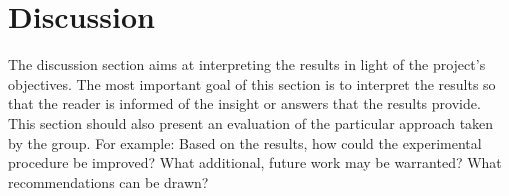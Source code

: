 \section{Discussion}
The discussion section aims at interpreting the results in light of the project's objectives.
The most important goal of this section is to interpret the results so that the reader is informed of the insight or answers that the results provide.
This section should also present an evaluation of the particular approach taken by the group.
For example: Based on the results, how could the experimental procedure be improved?
What additional, future work may be warranted?
What recommendations can be drawn?
